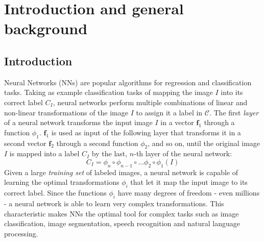 

\setcounter{page}{1}



\section {Introduction and general background} 

\subsection{Introduction}

Neural Networks (NNs) are popular algorithms for regression and classification tasks. Taking as example classification tasks of mapping the image $I$ into its correct label $C_I$, neural networks perform multiple combinations of linear and non-linear transformations of the image $I$ to assign it a label in $\mathcal C$.  The first \textit{layer} of a neural network transforms the input image $I$ in a vector $\mathbf f_1$ through a function $\phi_1$. $\mathbf f_1$ is used as input of the following layer that transforms it in a second vector $\mathbf f_2$ through a second function $\phi_2$, and so on, until the original image $I$ is mapped into a label $C_I$ by the last, $n$-th layer of the neural network:
$$C_I = \phi_n \circ \phi_{n-1}\circ ... \phi_2\circ\phi_1 (I)$$
 Given a large \textit{training set} of labeled images, a neural network is capable of learning the optimal transformations $\phi_i$ that let it map the input image to its correct label. Since the functions $\phi_i$ have many degrees of freedom - even millions - a neural network is able to learn very complex transformations. This characteristic makes NNs the optimal tool for complex tasks such as image classification, image segmentation, speech recognition and natural language processing.\\

